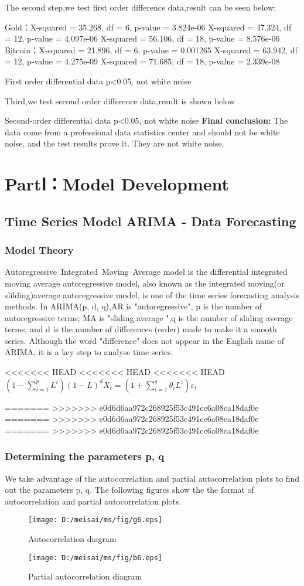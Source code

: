 \documentclass{mcmthesis}
\begin{document}
The second step,we test first order difference data,result can be seen below:

Gold：X-squared = 35.268, df = 6, p-value = 3.824e-06
X-squared = 47.324, df = 12, p-value = 4.097e-06
X-squared = 56.106, df = 18, p-value = 8.576e-06
Bitcoin：X-squared = 21.896, df = 6, p-value = 0.001265
X-squared = 63.942, df = 12, p-value = 4.275e-09
X-squared = 71.685, df = 18, p-value = 2.339e-08

First order differential data p<0.05, not white noise

Third,we test second order difference data,result is shown below

Second-order differential data p<0.05, not white noise
\textbf{Final conclusion: }
The data come from a professional data statistics center and should not be white noise, and the test results prove it. They are not white noise.


\section{PartⅠ：Model Development }
\subsection{Time Series Model ARIMA - Data Forecasting }
\subsubsection{Model Theory}
Autoregressive Integrated Moving Average model is the differential integrated moving average autoregressive model, 
also known as the integrated moving(or slilding)average autoregressive model, 
is one of the time series forecasting analysis methods. 
In ARIMA(p, d, q),AR is "autoregressive", p is the number of autoregressive terms;
MA is "sliding average ",q is the number of sliding average terms, and d is the number of differences (order) made to make it a smooth series.
Although the word "difference" does not appear in the English name of ARIMA, it is a key step to analyse time series.

<<<<<<< HEAD
<<<<<<< HEAD
<<<<<<< HEAD
$\left(1-\sum_{i=1}^{p} L^i \right)(1-L)^d X_t=\left(1+\sum_{i=1}^{q}\theta_i L^i \right)\varepsilon_t$

=======
>>>>>>> e0d6d6aa972c268925f53c491cc6a08ca18daf0e
=======
>>>>>>> e0d6d6aa972c268925f53c491cc6a08ca18daf0e
=======
>>>>>>> e0d6d6aa972c268925f53c491cc6a08ca18daf0e
\subsubsection{Determining the parameters p, q }
We take advantage of the autocorrelation and partial autocorrelation plots to find out the parameters p, q.
The following figures show the the format of autocorrelation and partial autocorrelation plots.
\begin{figure}[!h]
  \centering 
  \texttt{[image: D:/meisai/ms/fig/g6.eps]}
  \caption{Autocorrelation diagram}
  \texttt{[image: D:/meisai/ms/fig/b6.eps]}
  \caption{Partial autocorrelation diagram} \label{fig6}
\end{figure}
\end{document}
